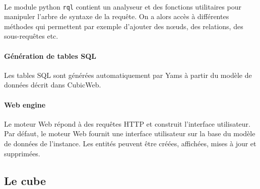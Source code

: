 \documentclass {report}
\begin{document}
\paragraph{}
Le module python \verb+rql+ contient un analyseur et des fonctions utilitaires pour manipuler l'arbre de syntaxe de la requête. On a alors accès à différentes méthodes qui permettent par exemple d'ajouter des nœuds, des relations, des sous-requêtes etc.


\paragraph{Génération de tables SQL}
Les tables SQL sont générées automatiquement par Yams à partir du modèle de données décrit dans CubicWeb.

\paragraph{Web engine}
Le moteur Web répond à des requêtes HTTP et construit l'interface utilisateur. Par défaut, le moteur Web fournit une interface utilisateur sur la base du modèle de données de l'instance. Les entités peuvent être créées, affichées, mises à jour et supprimées. 

\subsection{Le cube}
\end{document}
